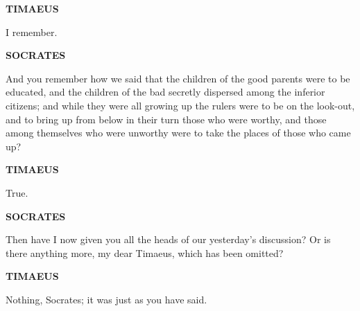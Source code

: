 \documentclass[11pt,letter]{article}
\begin{document}
\par \textbf{TIMAEUS}
\par   I remember.

\par \textbf{SOCRATES}
\par   And you remember how we said that the children of the good parents were to be educated, and the children of the bad secretly dispersed among the inferior citizens; and while they were all growing up the rulers were to be on the look-out, and to bring up from below in their turn those who were worthy, and those among themselves who were unworthy were to take the places of those who came up?

\par \textbf{TIMAEUS}
\par   True.

\par \textbf{SOCRATES}
\par   Then have I now given you all the heads of our yesterday’s discussion? Or is there anything more, my dear Timaeus, which has been omitted?

\par \textbf{TIMAEUS}
\par   Nothing, Socrates; it was just as you have said.
\end{document}
